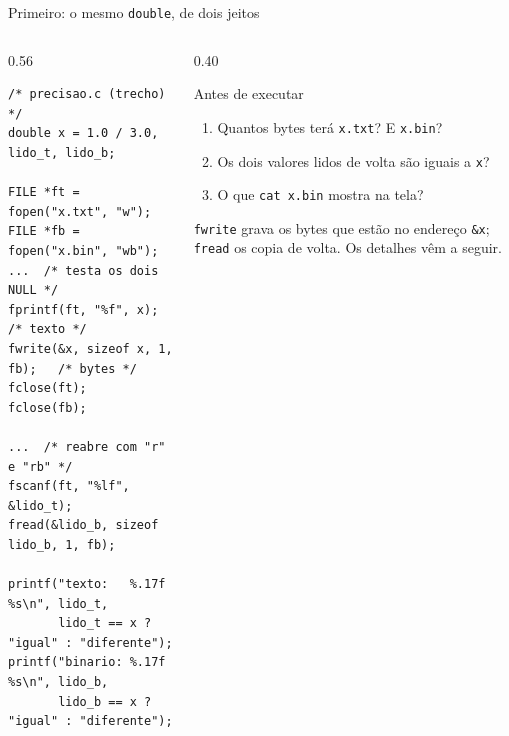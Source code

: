 \documentclass[aspectratio=169]{beamer}
\begin{document}
\begin{frame}[fragile]{Primeiro: o mesmo \texttt{double}, de dois jeitos}
  \vspace{-0.9em}
  \begin{columns}[T]
    \begin{column}{0.56\textwidth}
\begin{lstlisting}[style=codCs]
/* precisao.c (trecho) */
double x = 1.0 / 3.0, lido_t, lido_b;

FILE *ft = fopen("x.txt", "w");
FILE *fb = fopen("x.bin", "wb");
...  /* testa os dois NULL */
fprintf(ft, "%f", x);          /* texto */
fwrite(&x, sizeof x, 1, fb);   /* bytes */
fclose(ft);
fclose(fb);

...  /* reabre com "r" e "rb" */
fscanf(ft, "%lf", &lido_t);
fread(&lido_b, sizeof lido_b, 1, fb);

printf("texto:   %.17f  %s\n", lido_t,
       lido_t == x ? "igual" : "diferente");
printf("binario: %.17f  %s\n", lido_b,
       lido_b == x ? "igual" : "diferente");
\end{lstlisting}
    \end{column}
    \begin{column}{0.40\textwidth}
      \begin{block}{Antes de executar}
        \small
        \begin{enumerate}
          \item Quantos bytes terá \texttt{x.txt}? E \texttt{x.bin}?
          \item Os dois valores lidos de volta são iguais a \texttt{x}?
          \item O que \texttt{cat x.bin} mostra na tela?
        \end{enumerate}
      \end{block}
      \small \texttt{fwrite} grava os bytes que estão no endereço
      \texttt{\&x}; \texttt{fread} os copia de volta. Os detalhes vêm a
      seguir.
    \end{column}
  \end{columns}
\end{frame}
\end{document}
